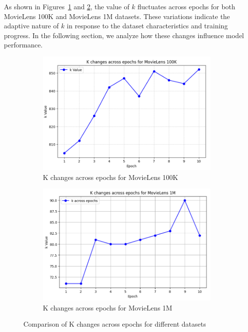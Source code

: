 \documentclass[review]{jair}
\begin{document}
As shown in Figures~\ref{fig:k_changes_100K} and \ref{fig:k_changes_1M}, the value of $k$ fluctuates across epochs for both MovieLens 100K and MovieLens 1M datasets. These variations indicate the adaptive nature of $k$ in response to the dataset characteristics and training progress. In the following section, we analyze how these changes influence model performance.  

\begin{figure}[htbp]
	\centering
	\begin{subfigure}{0.48\textwidth}
		\centering
		\includegraphics[width=\linewidth]{CHAGES_OF_K_FOR_100k.png}
		\caption{K changes across epochs for MovieLens 100K}
		\label{fig:k_changes_100K}
	\end{subfigure}
	\hfill
	\begin{subfigure}{0.48\textwidth}
		\centering
		\includegraphics[width=\linewidth]{chnages_inK_for_1M.png}
		\caption{K changes across epochs for MovieLens 1M}
		\label{fig:k_changes_1M}
	\end{subfigure}
	\caption{Comparison of K changes across epochs for different datasets}
	\label{fig:k_changes}
\end{figure}
\end{document}
